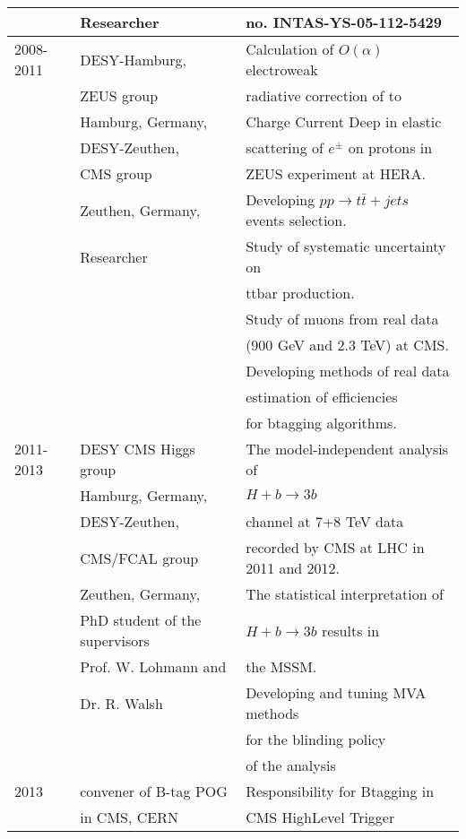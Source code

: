 {{\begin{tabular}{lll}
               & Researcher             &  no. INTAS-YS-05-112-5429		  \\ 
\hline
2008-2011      & DESY-Hamburg,		&  Calculation of $O(\alpha)$ electroweak    \\ 
               & ZEUS group    		&  radiative  correction of to            \\ 
               & Hamburg, Germany,	&  Charge Current Deep in elastic         \\
               & DESY-Zeuthen,     	&  scattering of $e^{\pm}$ on protons in  \\ 
               & CMS group      	&  ZEUS experiment at HERA.               \\
               & Zeuthen, Germany,      &  Developing $pp\rightarrow t\bar{t} + jets$ events selection.  \\
               & Researcher             &  Study of systematic uncertainty  on    \\
               &                        &  ttbar production.                      \\ 
               &                        &  Study of muons from real data           \\
               &                        &  (900 GeV and 2.3 TeV) at CMS.          \\
               &                        &  Developing methods of real data  	  \\
	       &			&  estimation of efficiencies  		  \\
	       &			&  for btagging algorithms.		  \\
\hline
2011-2013      & DESY CMS Higgs group	&  The model-independent analysis of    \\ 
               & Hamburg, Germany,      &    $H+b\rightarrow 3b$                 \\ 
               & DESY-Zeuthen,     	&  channel at 7+8 TeV data  \\ 
               & CMS/FCAL group      	&  recorded by CMS at LHC in 2011 and 2012. \\
               & Zeuthen, Germany,      &  The statistical interpretation of   \\
               & PhD student of the supervisors    &   $H+b\rightarrow 3b$ results in   \\
               & Prof. W. Lohmann and   &  the MSSM.                      \\ 
               & Dr. R. Walsh           &  Developing and tuning MVA methods         \\
               &                        &  for the blinding policy          \\
               &                        &  of the analysis  	  \\          	
\hline
2013           & convener of B-tag POG  &  Responsibility for  Btagging in \\ 
               &   in CMS, CERN         &  CMS  HighLevel Trigger          \\


\end{tabular}}}
